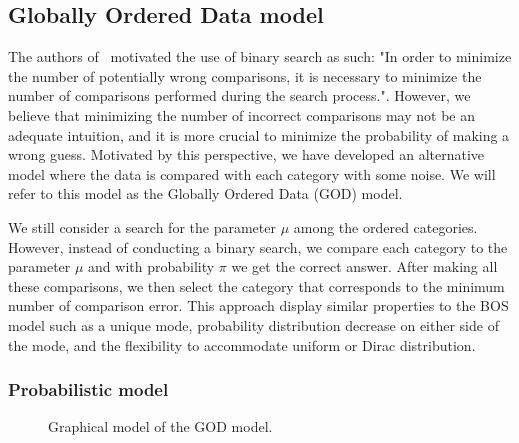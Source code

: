 \subsection{Globally Ordered Data model}



The authors of~\cite{biernacki2016model} motivated the use of binary search as such: "In order to minimize the number of potentially wrong comparisons, it
is necessary to minimize the number of comparisons performed during the search process.". However, we believe that minimizing the number of incorrect comparisons may not be an adequate intuition, and it is more crucial to minimize the probability of making a wrong guess. Motivated by this perspective, we have developed an alternative model where the data is compared with each category with some noise. We will refer to this model as the Globally Ordered Data (GOD) model.

We still consider a search for the parameter $\mu$ among the ordered categories. However, instead of conducting a binary search, we compare each category to the parameter $\mu$ and with probability $\pi$ we get the correct answer. After making all these comparisons, we then select the category that corresponds to the minimum number of comparison error. This approach display similar properties to the BOS model such as a unique mode, probability distribution decrease on either side of the mode, and the flexibility to accommodate uniform or Dirac distribution.

\subsubsection{Probabilistic model}

\begin{figure}[htbp]
    \centering
    \caption{Graphical model of the GOD model.}
    \label{fig:god_graphical_model}
\end{figure}
    
